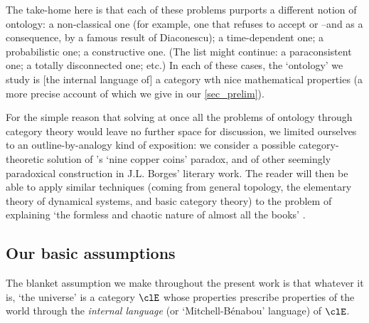 The take-home here is that each of these problems purports a different notion of ontology: a non-classical one (for example, one that refuses to accept  or  --and  as a consequence, by a famous result of Diaconescu); a time-dependent one; a probabilistic one; a constructive one. (The list might continue: a paraconsistent one; a totally disconnected one; etc.)
In each of these cases, the `ontology' we study is [the internal language of] a category wth nice mathematical properties (a more precise account of which we give in our \autoref{sec_prelim}).

For the simple reason that solving at once all the problems of ontology through category theory would leave no further space for discussion, we limited ourselves to an outline-by-analogy kind of exposition: we consider a possible category-theoretic solution of \tlon's `nine copper coins' paradox, and of other seemingly paradoxical construction in J.L. Borges' literary work. The reader will then be able to apply similar techniques (coming from general topology, the elementary theory of dynamical systems, and basic category theory) to the problem of explaining `the formless and chaotic nature of almost all the books' \cite{tlonEN}.


\subsection{Our basic assumptions}

The blanket assumption we make throughout the present work is that whatever it is, `the universe' is a category $\clE$ whose properties prescribe properties of the world through the \emph{internal language} (or `Mitchell-Bénabou' language) of $\clE$. 

